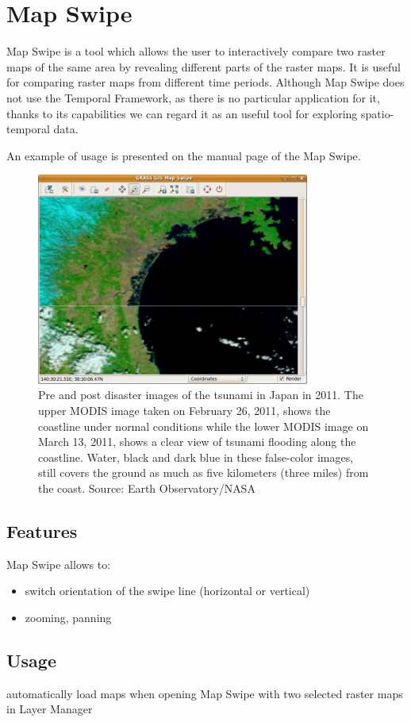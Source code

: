\documentclass[a4paper,12pt]{book}
\newcommand{\tf}{Temporal Framework\xspace}
\newcommand{\ms}{Map Swipe\xspace}
\begin{document}
\section{\ms}
\ms is a tool which allows the user to interactively compare two raster maps
of the same area by revealing different parts of the raster maps.
It is useful for comparing raster maps from different time periods.
Although \ms does not use the \tf, as there is no particular application for it,
thanks to its capabilities we can regard it as an useful tool for exploring spatio-temporal data.

An example of usage is presented on the manual page \cite{grassUserMan} of the \ms.
\begin{figure}[h!]
  \centering
  \includegraphics[width=0.8\textwidth]{./images/mapswipe_tsunami.jpeg}
  \caption{Pre and post disaster images of the tsunami in Japan in 2011.
  The upper MODIS image taken on February 26, 2011, shows the coastline under normal conditions
  while the lower MODIS image on March 13, 2011, shows a clear view of tsunami flooding along the coastline.
  Water, black and dark blue in these false-color images, still covers the ground as much as five kilometers
  (three miles) from the coast. Source: Earth Observatory/NASA}
\end{figure}


\subsection{Features}
Map Swipe allows to:
\begin{itemize}
    \item switch orientation of the swipe line (horizontal or vertical)
    \item zooming, panning

\end{itemize}

    
\subsection{Usage}
automatically load maps when opening Map Swipe with two selected raster maps in Layer Manager












\newpage
\clearpage
\printbibliography
\end{document}
